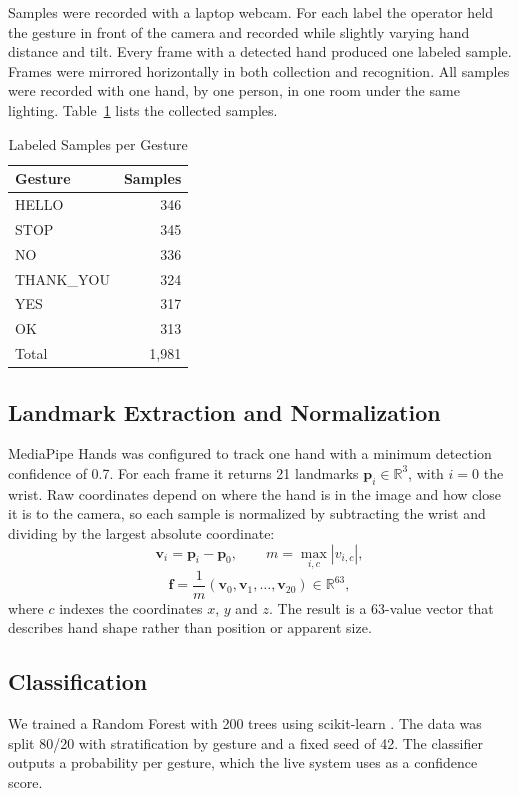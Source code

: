 \documentclass[conference]{IEEEtran}
\begin{document}
Samples were recorded with a laptop webcam. For each label the operator held the gesture in front of the camera and recorded while slightly varying hand distance and tilt. Every frame with a detected hand produced one labeled sample. Frames were mirrored horizontally in both collection and recognition. All samples were recorded with one hand, by one person, in one room under the same lighting. Table~\ref{tab:data} lists the collected samples.

\begin{table}[t]
\caption{Labeled Samples per Gesture}
\label{tab:data}
\centering
\begin{tabular}{lr}
\toprule
Gesture & Samples \\
\midrule
HELLO & 346 \\
STOP & 345 \\
NO & 336 \\
THANK\_YOU & 324 \\
YES & 317 \\
OK & 313 \\
\midrule
Total & 1,981 \\
\bottomrule
\end{tabular}
\end{table}

\subsection{Landmark Extraction and Normalization}
MediaPipe Hands was configured to track one hand with a minimum detection confidence of 0.7. For each frame it returns 21 landmarks $\mathbf{p}_i\in\mathbb{R}^3$, with $i=0$ the wrist. Raw coordinates depend on where the hand is in the image and how close it is to the camera, so each sample is normalized by subtracting the wrist and dividing by the largest absolute coordinate:
\begin{equation}
\mathbf{v}_i=\mathbf{p}_i-\mathbf{p}_0,\qquad m=\max_{i,c}\left|v_{i,c}\right|,
\end{equation}
\begin{equation}
\mathbf{f}=\frac{1}{m}\left(\mathbf{v}_0,\mathbf{v}_1,\dots,\mathbf{v}_{20}\right)\in\mathbb{R}^{63},
\end{equation}
where $c$ indexes the coordinates $x$, $y$ and $z$. The result is a 63-value vector that describes hand shape rather than position or apparent size.

\subsection{Classification}
We trained a Random Forest with 200 trees using scikit-learn \cite{pedregosa2011}. The data was split 80/20 with stratification by gesture and a fixed seed of 42. The classifier outputs a probability per gesture, which the live system uses as a confidence score.
\end{document}
